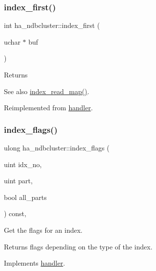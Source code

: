\subsubsection{\texorpdfstring{index\+\_\+first()}{index\_first()}}
{\footnotesize\ttfamily int ha\+\_\+ndbcluster\+::index\+\_\+first (\begin{DoxyParamCaption}\item[{uchar $\ast$}]{buf }\end{DoxyParamCaption})\hspace{0.3cm}{\ttfamily [virtual]}}

\begin{DoxyReturn}{Returns}

\end{DoxyReturn}
\begin{DoxySeeAlso}{See also}
\mbox{\hyperlink{classhandler_af8c2b258691e5baac8dd22d19c084b37}{index\+\_\+read\+\_\+map()}}. 
\end{DoxySeeAlso}


Reimplemented from \mbox{\hyperlink{classhandler_af37bd518c53c966459632584c34855d0}{handler}}.

\mbox{\label{classha__ndbcluster_a129ea7ed14c99a3437beff5fece3e832}} 
\subsubsection{\texorpdfstring{index\+\_\+flags()}{index\_flags()}}
{\footnotesize\ttfamily ulong ha\+\_\+ndbcluster\+::index\+\_\+flags (\begin{DoxyParamCaption}\item[{uint}]{idx\+\_\+no,  }\item[{uint}]{part,  }\item[{bool}]{all\+\_\+parts }\end{DoxyParamCaption}) const\hspace{0.3cm}{\ttfamily [inline]}, {\ttfamily [virtual]}}

Get the flags for an index.

\begin{DoxyReturn}{Returns}
flags depending on the type of the index. 
\end{DoxyReturn}


Implements \mbox{\hyperlink{classhandler}{handler}}.

